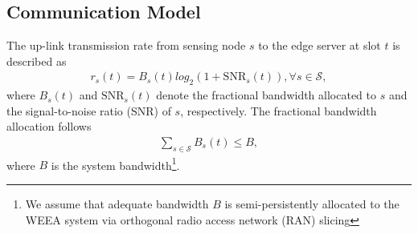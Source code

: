 \documentclass[lettersize,journal]{IEEEtran}
\theoremstyle{custom}
\begin{document}





\subsection{Communication Model}
The up-link transmission rate from sensing node $s$ to the edge server at slot $t$ is described as
\begin{align}
    r_{s}(t) = B_s(t) log_2\left(1 + \mathrm{SNR}_s(t) \right), \forall s \in \mathcal{S}, 
\end{align}
where $B_s(t)$ and $\mathrm{SNR}_s(t)$ denote the fractional bandwidth allocated to $s$ and the signal-to-noise ratio (SNR) of $s$, respectively. The fractional bandwidth allocation follows
\begin{align}\label{bandwidth_cons}
    \sum_{s \in \mathcal{S}}B_s(t) \leq B, 
\end{align}
where $B$ is the system bandwidth\footnote{We assume that adequate bandwidth $B$ is semi-persistently allocated to the WEEA system via orthogonal radio access network (RAN) slicing}. 
\end{document}
